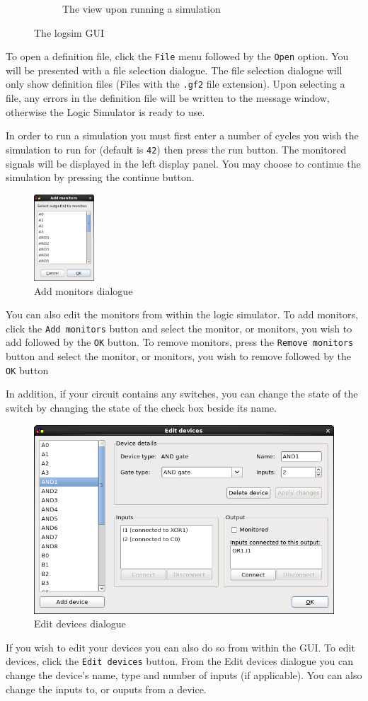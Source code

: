 \documentclass[a4paper,10pt]{article}
\begin{document}
\begin{figure}[h]
\begin{subfigure}[h]{0.4\textwidth}
                \caption{The view upon running a simulation}
                \label{fig:simulation}
        \end{subfigure}
        \caption{The logsim GUI}\label{fig:gui}
\end{figure}

To open a definition file, click the \texttt{File} menu followed by the \texttt{Open} option. You will be presented with a file selection dialogue. The file selection dialogue will only show definition files (Files with the \texttt{.gf2} file extension). Upon selecting a file, any errors in the definition file will be written to the message window, otherwise the Logic Simulator is ready to use. 

In order to run a simulation you must first enter a number of cycles you wish the simulation to run for (default is \texttt{42}) then press the run button. The monitored signals will be displayed in the left display panel. You may choose to continue the simulation by pressing the continue button.

\begin{figure}
  \begin{center}
    \includegraphics[width=0.2\textwidth]{monitors}
  \end{center}
  \caption{Add monitors dialogue}
\end{figure}

You can also edit the monitors from within the logic simulator. To add monitors, click the \texttt{Add monitors} button and select the monitor, or monitors, you wish to add followed by the \texttt{OK} button. To remove monitors, press the \texttt{Remove monitors} button and select the monitor, or monitors, you wish to remove followed by the \texttt{OK} button

In addition, if your circuit contains any  switches, you can change the state of the switch by changing the state of the check box beside its name.


\begin{figure}
  \begin{center}
    \includegraphics[width=.4\textwidth]{devices}
  \end{center}
  \caption{Edit devices dialogue}
\end{figure}

If you wish to edit your devices you can also do so from within the GUI. To edit devices, click the \texttt{Edit devices} button. From the Edit devices dialogue you can change the device's name, type and number of inputs (if applicable). You can also change the inputs to, or ouputs from a device.
\end{document}
